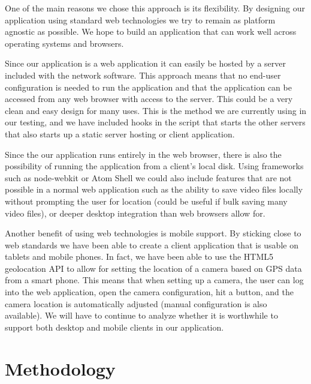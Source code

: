 One of the main reasons we chose this approach is its flexibility. By designing
our application using standard web technologies we try to remain as platform
agnostic as possible. We hope to build an application that can work well across
operating systems and browsers.

Since our application is a web application it can easily be hosted by a server
included with the network software. This approach means that no end-user
configuration is needed to run the application and that the application can be
accessed from any web browser with access to the server. This could be a very
clean and easy design for many uses. This is the method we are currently using
in our testing, and we have included hooks in the script that starts the other
servers that also starts up a static server hosting or client application.

Since the our application runs entirely in the web browser, there is also the
possibility of running the application from a client's local disk. Using
frameworks such as node-webkit\cite{nw_home} or Atom Shell\cite{atom_home} we
could also include features that are not possible in a normal web application
such as the ability to save video files locally without prompting the user for
location (could be useful if bulk saving many video files), or deeper desktop
integration than web browsers allow for.

Another benefit of using web technologies is mobile support. By sticking close
to web standards we have been able to create a client application that is usable
on tablets and mobile phones. In fact, we have been able to use the HTML5
geolocation API to allow for setting the location of a camera based on GPS data
from a smart phone. This means that when setting up a camera, the user can log
into the web application, open the camera configuration, hit a button, and the
camera location is automatically adjusted (manual configuration is also
available). We will have to continue to analyze whether it is worthwhile to
support both desktop and mobile clients in our application.


\section{Methodology}

